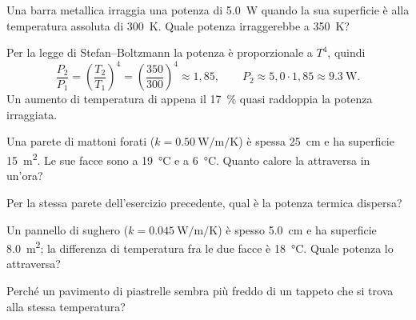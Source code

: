 \begin{testexample}
Una barra metallica irraggia una potenza di \SI{5,0}{\watt} quando la sua superficie è alla temperatura assoluta di \SI{300}{\kelvin}. Quale potenza irraggerebbe a \SI{350}{\kelvin}?

Per la legge di Stefan--Boltzmann la potenza è proporzionale a $T^4$, quindi
\[ \frac{P_2}{P_1} = \left(\frac{T_2}{T_1}\right)^4 = \left(\frac{350}{300}\right)^4 \approx 1{,}85, \qquad P_2 \approx 5{,}0 \cdot 1{,}85 \approx \SI{9,3}{\watt}. \]
Un aumento di temperatura di appena il \SI{17}{\percent} quasi raddoppia la potenza irraggiata.
\end{testexample}

\begin{esercizio}
Una parete di mattoni forati ($k = \SI{0,50}{\watt\per\metre\per\kelvin}$) è spessa \SI{25}{\centi\metre} e ha superficie \SI{15}{\metre\squared}. Le sue facce sono a \SI{19}{\celsius} e a \SI{6}{\celsius}. Quanto calore la attraversa in un'ora?\\
\end{esercizio}

\begin{esercizio}
Per la stessa parete dell'esercizio precedente, qual è la potenza termica dispersa?\\
\end{esercizio}

\begin{esercizio}
Un pannello di sughero ($k = \SI{0,045}{\watt\per\metre\per\kelvin}$) è spesso \SI{5,0}{\centi\metre} e ha superficie \SI{8,0}{\metre\squared}; la differenza di temperatura fra le due facce è \SI{18}{\celsius}. Quale potenza lo attraversa?\\
\end{esercizio}

\begin{esercizio}
Perché un pavimento di piastrelle sembra più freddo di un tappeto che si trova alla stessa temperatura?\\
\end{esercizio}

